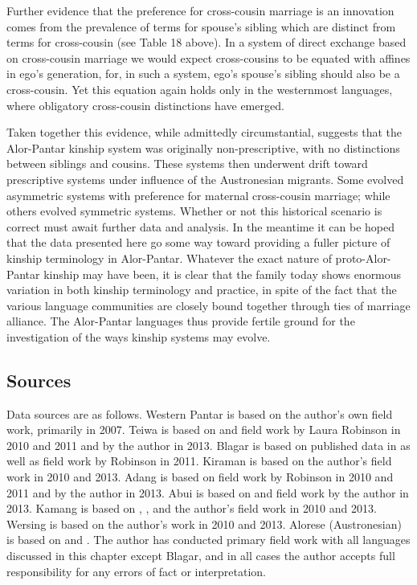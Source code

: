 Further evidence that the preference for cross-cousin marriage is an innovation comes from the prevalence of terms for spouse's  sibling which are distinct from terms for cross-cousin (see Table 18 above). In a system of direct exchange based on cross-cousin marriage we would expect cross-cousins to be equated with affines in ego's generation, for, in such a system, ego's spouse's sibling should also be a cross-cousin. Yet this equation again holds only in the westernmost languages, where obligatory cross-cousin distinctions have emerged.

Taken together this evidence, while admittedly circumstantial, suggests that the Alor-Pantar kinship system was originally non-prescriptive, with no distinctions between siblings and cousins. These systems then underwent drift toward prescriptive systems under influence of the Austronesian migrants. Some evolved asymmetric systems with preference for maternal cross-cousin marriage; while others evolved symmetric systems. Whether or not this historical scenario is correct must await further data and analysis. In the meantime it can be hoped that the data presented here go some way toward providing a fuller picture of kinship terminology in Alor-Pantar. Whatever the exact nature of proto-Alor-Pantar kinship may have been, it is clear that the family today shows enormous variation in both kinship terminology and practice, in spite of the fact that the various language communities are closely bound together through ties of marriage alliance. The Alor-Pantar languages thus provide fertile ground for the investigation of the ways kinship systems may evolve.

\subsection{Sources}
Data sources are as follows. Western Pantar is based on the author's own field work, primarily in 2007. Teiwa is based on \citet{Klamer2010} and field work by Laura Robinson in 2010 and 2011 and by the author in 2013. Blagar is based on published data in \citet{Steinhauer1993} as well as field work by Robinson in 2011. Kiraman is based on the author's field work in 2010 and 2013. Adang is based on field work by Robinson in 2010 and 2011 and by the author in 2013. Abui is based on \citet{KratochvilEtAl2008} and field work by the author in 2013. Kamang is based on \citet{Stokhof1977}, \citet{SchapperEtAl2011}, and the author's field work in 2010 and 2013. Wersing is based on the author's work in 2010 and 2013. Alorese (Austronesian) is based on \citet{Needham1956} and \citet{Barnes1973}. The author has conducted primary field work with all languages discussed in this chapter except Blagar, and in all cases the author accepts full responsibility for any errors of fact or interpretation.
